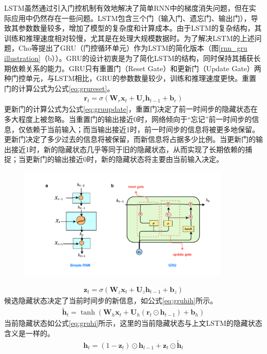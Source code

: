 LSTM虽然通过引入门控机制有效地解决了简单RNN中的梯度消失问题，但在实际应用中仍然存在一些问题。LSTM包含三个门（输入门、遗忘门、输出门），导致其参数数量较多，增加了模型的复杂度和计算成本。由于LSTM的复杂结构，其训练和推理速度相对较慢，尤其是在处理大规模数据时。为了解决LSTM的上述问题，Cho等提出了GRU（门控循环单元）作为LSTM的简化版本\cite{choLearningPhraseRepresentations2014}（图\ref{rnn_gru illustration}（b））。GRU的设计初衷是为了简化LSTM的结构，同时保持其捕获长期依赖关系的能力。GRU只有重置门（Reset Gate）和更新门（Update Gate）两种门控单元，与LSTM相比，GRU的参数数量较少，训练和推理速度更快。重置门的计算公式为公式\eqref{eq:grureset}。
\begin{align}
  \mathbf{r}_t = \sigma(\mathbf{W}_r \mathbf{x}_t + \mathbf{U}_r \mathbf{h}_{t-1} + \mathbf{b}_r) \label{eq:grureset}
\end{align}
更新门的计算公式为公式\eqref{eq:gruupdate}，重置门决定了前一时间步的隐藏状态在多大程度上被忽略。当重置门的输出接近0时，网络倾向于“忘记”前一时间步的信息，仅依赖于当前输入；而当输出接近1时，前一时间步的信息将被更多地保留。
更新门决定了多少过去的信息将被保留，而新信息将占据多少比例。当更新门的输出接近1时，新的隐藏状态几乎等同于旧的隐藏状态，从而实现了长期依赖的捕捉；当更新门的输出接近0时，新的隐藏状态将主要由当前输入决定。
\begin{figure}[htbp]
  \centering
  \includegraphics[width=0.9\textwidth]{Fig/rnn-gru.pdf}
\end{figure}
\begin{align}
  \mathbf{z}_t = \sigma(\mathbf{W}_z \mathbf{x}_t + \mathbf{U}_z \mathbf{h}_{t-1} + \mathbf{b}_z) \label{eq:gruupdate}
\end{align}
候选隐藏状态决定了当前时间步的新信息，如公式\eqref{eq:gruhih}所示。
\begin{align}
  \tilde{\mathbf{h}}_t = \tanh(\mathbf{W}_h \mathbf{x}_t + \mathbf{U}_h (\mathbf{r}_t \odot \mathbf{h}_{t-1}) + \mathbf{b}_h) \label{eq:gruhih}
\end{align}
当前隐藏状态如公式\eqref{eq:gruhi}所示，这里的当前隐藏状态与上文LSTM的隐藏状态含义是一样的。
\begin{align}
  \mathbf{h}_t = (1 - \mathbf{z}_t) \odot \mathbf{h}_{t-1} + \mathbf{z}_t \odot \tilde{\mathbf{h}}_t \label{eq:gruhi}
\end{align}

